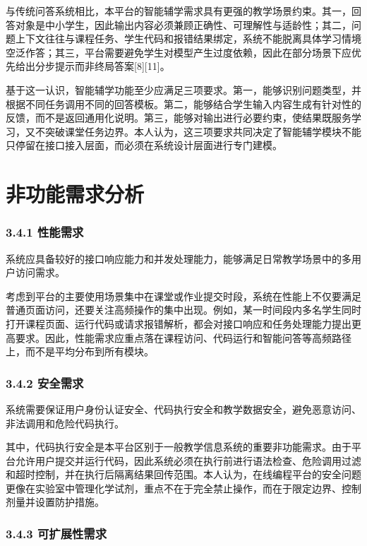 与传统问答系统相比，本平台的智能辅学需求具有更强的教学场景约束。其一，回答对象是中小学生，因此输出内容必须兼顾正确性、可理解性与适龄性；其二，问题上下文往往与课程任务、学生代码和报错结果绑定，系统不能脱离具体学习情境空泛作答；其三，平台需要避免学生对模型产生过度依赖，因此在部分场景下应优先给出分步提示而非终局答案{[}8{]}{[}11{]}。

基于这一认识，智能辅学功能至少应满足三项要求。第一，能够识别问题类型，并根据不同任务调用不同的回答模板。第二，能够结合学生输入内容生成有针对性的反馈，而不是返回通用化说明。第三，能够对输出进行必要约束，使结果既服务学习，又不突破课堂任务边界。本人认为，这三项要求共同决定了智能辅学模块不能只停留在接口接入层面，而必须在系统设计层面进行专门建模。

\section{非功能需求分析}\label{ux975eux529fux80fdux9700ux6c42ux5206ux6790}

\subsubsection{3.4.1 性能需求}\label{ux6027ux80fdux9700ux6c42}

系统应具备较好的接口响应能力和并发处理能力，能够满足日常教学场景中的多用户访问需求。

考虑到平台的主要使用场景集中在课堂或作业提交时段，系统在性能上不仅要满足普通页面访问，还要关注高频操作的集中出现。例如，某一时间段内多名学生同时打开课程页面、运行代码或请求报错解析，都会对接口响应和任务处理能力提出更高要求。因此，性能需求应重点落在课程访问、代码运行和智能问答等高频路径上，而不是平均分布到所有模块。

\subsubsection{3.4.2 安全需求}\label{ux5b89ux5168ux9700ux6c42}

系统需要保证用户身份认证安全、代码执行安全和教学数据安全，避免恶意访问、非法调用和危险代码执行。

其中，代码执行安全是本平台区别于一般教学信息系统的重要非功能需求。由于平台允许用户提交并运行代码，因此系统必须在执行前进行语法检查、危险调用过滤和超时控制，并在执行后隔离结果回传范围。本人认为，在线编程平台的安全问题更像在实验室中管理化学试剂，重点不在于完全禁止操作，而在于限定边界、控制剂量并设置防护措施。

\subsubsection{3.4.3 可扩展性需求}\label{ux53efux6269ux5c55ux6027ux9700ux6c42}

